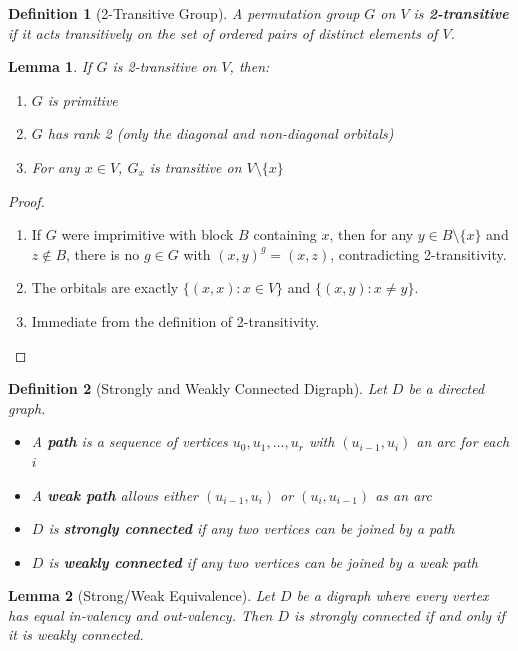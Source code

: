 \documentclass[12pt,a4paper,openany]{book}
\newtheorem{definition}{Definition}[section]
\newtheorem{lemma}{Lemma}[section]
\begin{document}
\begin{definition}[2-Transitive Group]
A permutation group $G$ on $V$ is \textbf{2-transitive} if it acts transitively on the set of ordered pairs of distinct elements of $V$.
\end{definition}

\begin{lemma}
If $G$ is 2-transitive on $V$, then:
\begin{enumerate}
\item $G$ is primitive
\item $G$ has rank 2 (only the diagonal and non-diagonal orbitals)
\item For any $x \in V$, $G_x$ is transitive on $V \setminus \{x\}$
\end{enumerate}
\end{lemma}

\begin{proof}
\begin{enumerate}
\item If $G$ were imprimitive with block $B$ containing $x$, then for any $y \in B \setminus \{x\}$ and $z \notin B$, there is no $g \in G$ with $(x,y)^g = (x,z)$, contradicting 2-transitivity.
\item The orbitals are exactly $\{(x,x) : x \in V\}$ and $\{(x,y) : x \neq y\}$.
\item Immediate from the definition of 2-transitivity.
\end{enumerate}
\end{proof}



\begin{definition}[Strongly and Weakly Connected Digraph]
Let $D$ be a directed graph.
\begin{itemize}
\item A \textbf{path} is a sequence of vertices $u_0, u_1, \dots, u_r$ with $(u_{i-1}, u_i)$ an arc for each $i$
\item A \textbf{weak path} allows either $(u_{i-1}, u_i)$ or $(u_i, u_{i-1})$ as an arc
\item $D$ is \textbf{strongly connected} if any two vertices can be joined by a path
\item $D$ is \textbf{weakly connected} if any two vertices can be joined by a weak path
\end{itemize}
\end{definition}

\begin{lemma}[Strong/Weak Equivalence]\label{lemma:strong-weak-connected}
Let $D$ be a digraph where every vertex has equal in-valency and out-valency. Then $D$ is strongly connected if and only if it is weakly connected.
\end{lemma}
\end{document}

